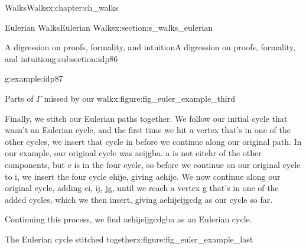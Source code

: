 \documentclass[oneside,10pt,]{book}
\numberwithin{equation}{section}
\begin{document}
\begin{chapterptx}{Walks}{}{Walks}{}{}{x:chapter:ch_walks}
\begin{sectionptx}{Eulerian Walks}{}{Eulerian Walks}{}{}{x:section:s_walks_eulerian}
\begin{subsectionptx}{A digression on proofs, formality, and intuition}{}{A digression on proofs, formality, and intuition}{}{}{g:subsection:idp86}
\begin{example}{}{g:example:idp87}
\begin{figureptx}{Parts of \(\Gamma\) missed by our walk}{x:figure:fig_euler_example_third}{}
\begin{image}{0.15}{0.7}{0.15}
{\begin{tikzpicture}[scale=2]
\end{tikzpicture}
}%
\end{image}%
\tcblower
\end{figureptx}%
Finally, we stitch our Eulerian paths together.  We follow our initial cycle that wasn't an Eulerian cycle, and the first time we hit a vertex that's in one of the other cycles, we insert that cycle in before we continue along our original path.  In our example, our original cycle was aeijgba.  a is not eitehr of the other components, but e is in the four cycle, so before we continue on our original cycle to i, we insert the four cycle ehije, giving aehije.  We now continue along our original cycle, adding ei, ij, jg, until we reach a vertex g that's in one of the added cycles, which we then insert, giving aehijeijgcdg as our cycle so far.%
\par
Continuing this process, we find aehijeijgcdgba as an Eulerian cycle.%
\begin{figureptx}{The Eulerian cycle stitched together}{x:figure:fig_euler_example_last}{}%
\begin{image}{0.15}{0.7}{0.15}%
\end{image}
\end{figureptx}
\end{example}
\end{subsectionptx}
\end{sectionptx}
\end{chapterptx}
\end{document}
